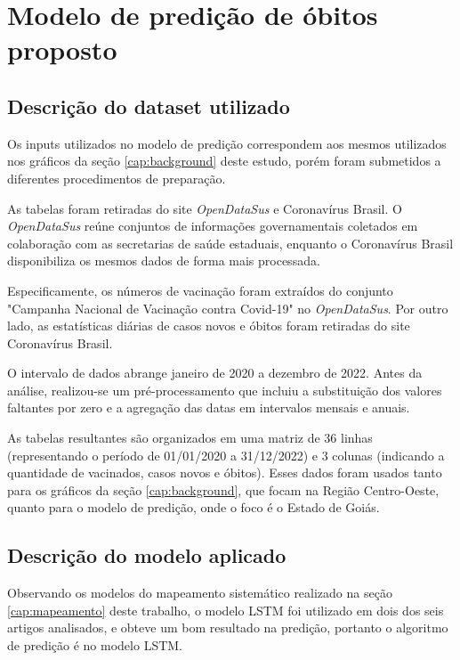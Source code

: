 \chapter{Modelo de predição de óbitos proposto}
\label{cap:modelo}

\section{Descrição do dataset utilizado}

Os inputs utilizados no modelo de predição correspondem aos mesmos utilizados nos gráficos da seção \ref{cap:background} deste estudo, porém foram submetidos a diferentes procedimentos de preparação.

As tabelas foram retiradas do site \textit{OpenDataSus} e Coronavírus Brasil. O \textit{OpenDataSus} reúne conjuntos de informações governamentais coletados em colaboração com as secretarias de saúde estaduais, enquanto o Coronavírus Brasil disponibiliza os mesmos dados de forma mais processada.

Especificamente, os números de vacinação foram extraídos do conjunto "Campanha Nacional de Vacinação contra Covid-19" no \textit{OpenDataSus}. Por outro lado, as estatísticas diárias de casos novos e óbitos foram retiradas do site Coronavírus Brasil.

O intervalo de dados abrange janeiro de 2020 a dezembro de 2022. Antes da análise, realizou-se um pré-processamento que incluiu a substituição dos valores faltantes por zero e a agregação das datas em intervalos mensais e anuais.

As tabelas resultantes são organizados em uma matriz de 36 linhas (representando o período de 01/01/2020 a 31/12/2022) e 3 colunas (indicando a quantidade de vacinados, casos novos e óbitos). Esses dados foram usados tanto para os gráficos da seção \ref{cap:background}, que focam na Região Centro-Oeste, quanto para o modelo de predição, onde o foco é o Estado de Goiás.

\section{Descrição do modelo aplicado}

Observando os modelos do mapeamento sistemático realizado na seção \ref{cap:mapeamento} deste trabalho, o modelo LSTM foi utilizado em dois dos seis artigos analisados, e obteve um bom resultado na predição, portanto o algoritmo de predição é no modelo LSTM.

